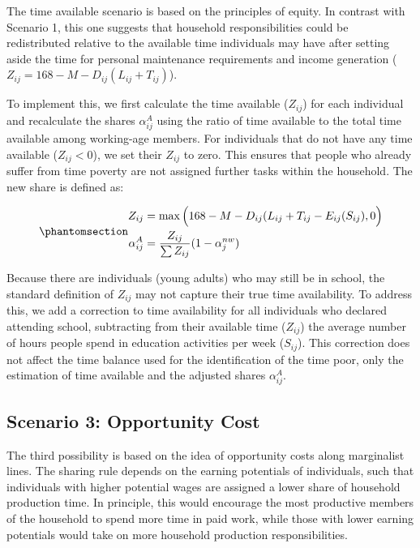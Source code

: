 \documentclass[
  11pt,
]{article}
\begin{document}
The time available scenario is based on the principles of equity. In
contrast with Scenario 1, this one suggests that household
responsibilities could be redistributed relative to the available time
individuals may have after setting aside the time for personal
maintenance requirements and income generation
(\(Z_{ij}=168-M-D_{ij}(L_{ij}+T_{ij})\)).

To implement this, we first calculate the time available (\(Z_{ij}\))
for each individual and recalculate the shares \(\alpha_{ij}^A\) using
the ratio of time available to the total time available among
working-age members. For individuals that do not have any time available
(\(Z_{ij}<0\)), we set their \(Z_{ij}\) to zero. This ensures that
people who already suffer from time poverty are not assigned further
tasks within the household. The new share is defined as:

\begin{equation}\phantomsection\label{eq-r2}{
\begin{aligned}
Z_{ij} &=\max{\Big(168-M-D_{ij}(L_{ij}+T_{ij}-E_{ij}(S_{ij}),0\Big)} \\
\alpha_{ij}^A &= \frac{Z_{ij}}{\sum Z_{ij}} (1-\alpha_{j}^{nw})
\end{aligned}
}\end{equation}

Because there are individuals (young adults) who may still be in school,
the standard definition of \(Z_{ij}\) may not capture their true time
availability. To address this, we add a correction to time availability
for all individuals who declared attending school, subtracting from
their available time (\(Z_{ij}\)) the average number of hours people
spend in education activities per week (\(S_{ij}\)). This correction
does not affect the time balance used for the identification of the time
poor, only the estimation of time available and the adjusted shares
\(\alpha_{ij}^A\).

\subsection{Scenario 3: Opportunity
Cost}\label{scenario-3-opportunity-cost}

The third possibility is based on the idea of opportunity costs along
marginalist lines. The sharing rule depends on the earning potentials of
individuals, such that individuals with higher potential wages are
assigned a lower share of household production time. In principle, this
would encourage the most productive members of the household to spend
more time in paid work, while those with lower earning potentials would
take on more household production responsibilities.
\end{document}

